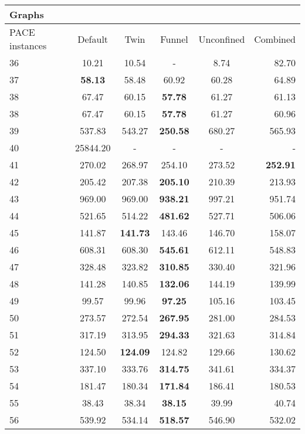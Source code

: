 \documentclass[a4paper,UKenglish,cleveref, autoref, thm-restate]{lipics-v2021}
\begin{document}
\begin{table}
	\begin{center}
		\begin{tabular}{|l| c| c| c| c| r|}
			
			\multicolumn{6}{|l|}{Graphs}\\	
			\hline
			PACE instances & Default & Twin & Funnel & Unconfined & Combined \\
			\hline
			36 & 10.21 & 10.54 & - & 8.74 & 82.70 \\
			37 & \textbf{58.13} & 58.48 & 60.92 & 60.28 & 64.89 \\
			38 & 67.47 & 60.15 & \textbf{57.78} & 61.27 & 61.13 \\
			38 & 67.47 & 60.15 & \textbf{57.78} & 61.27 & 60.96 \\
			39 & 537.83 & 543.27 & \textbf{250.58} & 680.27 & 565.93 \\
			40 & 25844.20 & - & - & - & - \\
			41 & 270.02 & 268.97 & 254.10 & 273.52 & \textbf{252.91} \\
			42 & 205.42 & 207.38 & \textbf{205.10} & 210.39 & 213.93 \\
			43 & 969.00 & 969.00 & \textbf{938.21} & 997.21 & 951.74 \\
			44 & 521.65 & 514.22 & \textbf{481.62} & 527.71 & 506.06 \\
			45 & 141.87 & \textbf{141.73} & 143.46 & 146.70 & 158.07 \\
			46 & 608.31 & 608.30 & \textbf{545.61} & 612.11 & 548.83 \\
			47 & 328.48 & 323.82 & \textbf{310.85} & 330.40 & 321.96 \\
			48 & 141.28 & 140.85 & \textbf{132.06} & 144.19 & 139.99 \\
			49 & 99.57 & 99.96 & \textbf{97.25} & 105.16 & 103.45 \\
			50 & 273.57 & 272.54 & \textbf{267.95} & 281.00 & 284.53 \\
			51 & 317.19 & 313.95 & \textbf{294.33} & 321.63 & 314.84 \\
			52 & 124.50 & \textbf{124.09} & 124.82 & 129.66 & 130.62 \\
			53 & 337.10 & 333.76 & \textbf{314.75} & 341.61 & 334.37 \\
			54 & 181.47 & 180.34 & \textbf{171.84} & 186.41 & 180.53 \\
			55 & 38.43 & 38.34 & \textbf{38.15} & 39.99 & 40.74 \\
			56 & 539.92 & 534.14 & \textbf{518.57} & 546.90 & 532.02 \\

\end{tabular}
\end{center}
\end{table}
\end{document}
